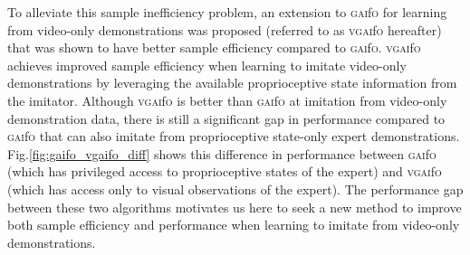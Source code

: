 \documentclass[letterpaper, 10 pt, conference]{ieeeconf}  %
\newcommand{\gaifo}{\textsc{gai}f\textsc{o}}
\newcommand{\vgaifo}{\textsc{vgai}f\textsc{o}}
\begin{document}
To alleviate this sample inefficiency problem, an extension to \gaifo{} for learning from video-only demonstrations was proposed \cite{gaifo_proprio} (referred to as \vgaifo{} hereafter) that was shown to have better sample efficiency compared to \gaifo{}. 
\vgaifo{} achieves improved sample efficiency when learning to imitate video-only demonstrations by leveraging the available proprioceptive state information from the imitator. Although \vgaifo{} is better than \gaifo{} at imitation from video-only demonstration data, there is still a significant gap in performance compared to \gaifo{} that can also imitate from proprioceptive state-only expert demonstrations. Fig.\ref{fig:gaifo_vgaifo_diff} shows this difference in performance between \gaifo{} (which has privileged access to proprioceptive states of the expert) and \vgaifo{} (which has access only to visual observations of the expert). The performance gap between these two algorithms motivates us here to seek a new method to improve both sample efficiency and performance when learning to imitate from video-only demonstrations.
\end{document}
